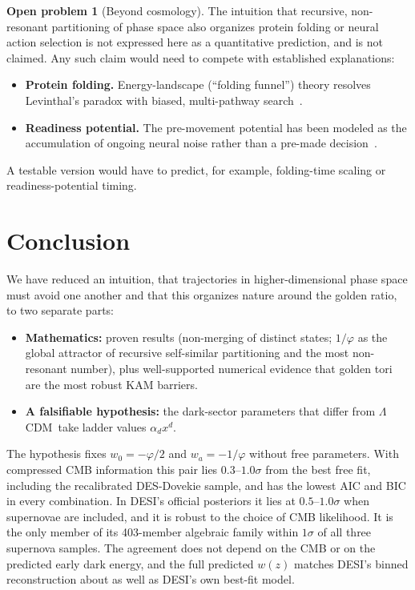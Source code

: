 \documentclass[11pt]{article}
\theoremstyle{definition}
\newtheorem{problem}{Open problem}
\theoremstyle{remark}
\newcommand{\gr}{\varphi}
\newcommand{\LCDM}{$\Lambda$CDM}
\begin{document}
\begin{problem}[Beyond cosmology]
The intuition that recursive, non-resonant partitioning of phase space also organizes protein folding or neural action selection is not expressed here as a quantitative prediction, and is not claimed. Any such claim would need to compete with established explanations:
\begin{itemize}
\item \textbf{Protein folding.} Energy-landscape (``folding funnel'') theory resolves Levinthal's paradox with biased, multi-pathway search~\cite{DillChan}.
\item \textbf{Readiness potential.} The pre-movement potential has been modeled as the accumulation of ongoing neural noise rather than a pre-made decision~\cite{Schurger}.
\end{itemize}
A testable version would have to predict, for example, folding-time scaling or readiness-potential timing.
\end{problem}

\section{Conclusion}

We have reduced an intuition, that trajectories in higher-dimensional phase space must avoid one another and that this organizes nature around the golden ratio, to two separate parts:
\begin{itemize}
\item \textbf{Mathematics:} proven results (non-merging of distinct states; $1/\gr$ as the global attractor of recursive self-similar partitioning and the most non-resonant number), plus well-supported numerical evidence that golden tori are the most robust KAM barriers.
\item \textbf{A falsifiable hypothesis:} the dark-sector parameters that differ from \LCDM\ take ladder values $\alpha_d x^d$.
\end{itemize}

The hypothesis fixes $w_0 = -\gr/2$ and $w_a = -1/\gr$ without free parameters. With compressed CMB information this pair lies $0.3$--$1.0\sigma$ from the best free fit, including the recalibrated DES-Dovekie sample, and has the lowest AIC and BIC in every combination. In DESI's official posteriors it lies at $0.5$--$1.0\sigma$ when supernovae are included, and it is robust to the choice of CMB likelihood. It is the only member of its 403-member algebraic family within $1\sigma$ of all three supernova samples. The agreement does not depend on the CMB or on the predicted early dark energy, and the full predicted $w(z)$ matches DESI's binned reconstruction about as well as DESI's own best-fit model.
\end{document}
